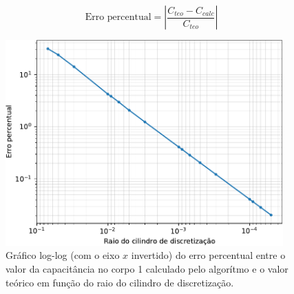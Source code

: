 \documentclass{aleph-revista}
\begin{document}
\begin{equation}\label{eq:erro}
  \text{Erro percentual} = \left|\frac{C_{teo} - C_{calc}}{C_{teo}}\right|
\end{equation}

\begin{figure}[!h]
  \centering
  \includegraphics[width=0.95\textwidth]{figures/calibration}
  \caption{Gráfico log-log (com o eixo $x$ invertido) do erro percentual entre o valor da capacitância no corpo 1 calculado pelo algorítmo e o valor teórico em função do raio do cilindro de discretização.}
  \label{fig:calibration}
\end{figure}
\end{document}
